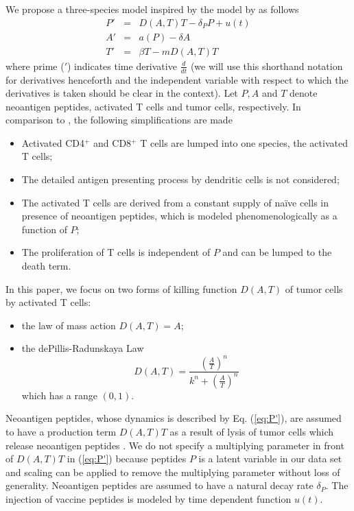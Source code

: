 \documentclass[review,authoryear]{elsarticle}
\begin{document}
We propose a three-species model inspired by the model by \cite{Messan2021} as follows
\begin{subequations}\label{eq:3sp-model}
\begin{eqnarray} 
P' & = & D(A,T)T-\delta_{P}P+u(t)\label{eq:P'}\\
A' & = & a(P)-\delta A\label{eq:A'}\\
T' & = & \beta T-mD(A,T)T\label{eq:T'}
\end{eqnarray}
\end{subequations}
where prime ($'$) indicates time derivative $\frac{d}{dt}$ (we will
use this shorthand notation for derivatives henceforth and the independent
variable with respect to which the derivatives is taken should be
clear in the context). Let $P, A$ and $T$ denote neoantigen peptides,
activated T cells and tumor cells, respectively. In comparison to \cite{Messan2021},
the following simplifications are made
\begin{itemize}
\item Activated CD4$^{+}$ and CD8$^{+}$ T cells are lumped into one species, the activated T cells;
\item The detailed antigen presenting process by dendritic cells is not considered;
\item The activated T cells are derived from a constant supply of na\"ive cells in presence of neoantigen peptides, which is modeled phenomenologically as a function of $P$;
\item The proliferation of T cells is independent of $P$ and can be lumped to the death term.
\end{itemize}

In this paper, we focus on two forms of killing function $D(A,T)$ of tumor cells by activated T cells:
\begin{itemize}
\item the law of mass action $D(A,T)=A$;
\item the dePillis-Radunskaya Law 
\begin{equation}
D(A,T)=\frac{(\frac{A}{T})^{n}}{k^{n}+(\frac{A}{T})^{n}} \label{eq:PR law-1} 
\end{equation}
which has a range $(0,1)$. 
\end{itemize}

Neoantigen peptides, whose dynamics is described by Eq. (\ref{eq:P'}), are assumed to have a production term $D(A,T)T$ as a result of lysis of tumor cells which release neoantigen peptides \citep{Konstorum2017}. We do not specify a multiplying parameter in front of $D(A,T)T$ in
(\ref{eq:P'}) because peptides $P$ is a latent variable in our data set and scaling
can be applied to remove the multiplying parameter without loss of
generality. Neoantigen peptides are assumed to have a natural decay rate $\delta_P$. The injection of vaccine peptides is modeled by time dependent function $u(t)$.
\end{document}
